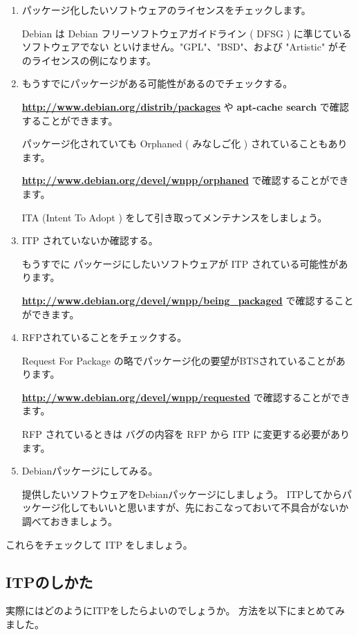 \documentclass[mingoth,a4paper]{jsarticle}
\begin{document}
  	\begin{enumerate}
  	\item パッケージ化したいソフトウェアのライセンスをチェックします。
	
        Debian は Debian フリーソフトウェアガイドライン ( DFSG ) に準じているソフトウェアでない
        といけません。"GPL"、"BSD"、および "Artistic" がそのライセンスの例になります。

    \item もうすでにパッケージがある可能性があるのでチェックする。
	
        {\bf \url{http://www.debian.org/distrib/packages} } や {\bf apt-cache search }で確認することができます。
		
        パッケージ化されていても Orphaned ( みなしご化 ) されていることもあります。
		
        {\bf \url{http://www.debian.org/devel/wnpp/orphaned} }で確認することができます。

        ITA (Intent To Adopt ) をして引き取ってメンテナンスをしましょう。

    \item ITP されていないか確認する。
	
        もうすでに パッケージにしたいソフトウェアが ITP されている可能性があります。

        {\bf \url{http://www.debian.org/devel/wnpp/being_packaged} }で確認することができます。

    \item RFPされていることをチェックする。
	
        Request For Package の略でパッケージ化の要望がBTSされていることがあります。

        {\bf \url{http://www.debian.org/devel/wnpp/requested} }で確認することができます。
		
        RFP されているときは バグの内容を RFP から ITP に変更する必要があります。

    \item Debianパッケージにしてみる。
	
        提供したいソフトウェアをDebianパッケージにしましょう。
        ITPしてからパッケージ化してもいいと思いますが、先におこなっておいて不具合がないか調べておきましょう。
		
	\end{enumerate}
    これらをチェックして ITP をしましょう。

\subsection{ITPのしかた}
    実際にはどのようにITPをしたらよいのでしょうか。
    方法を以下にまとめてみました。
\end{document}
